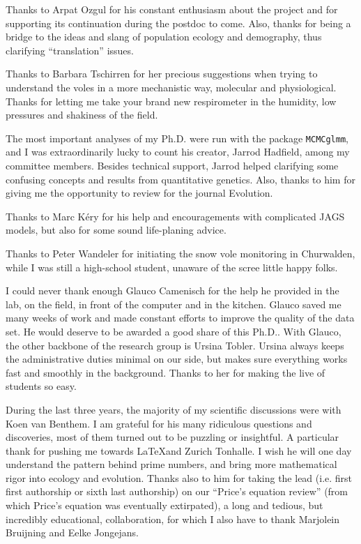 Thanks to Arpat Ozgul for his constant enthusiasm about the project and for supporting its continuation during the postdoc to come. Also, thanks for being a bridge to the ideas and slang of population ecology and demography, thus clarifying ``translation'' issues. 

Thanks to Barbara Tschirren for her precious suggestions when trying to understand the voles in a more mechanistic way, molecular and physiological. Thanks for letting me take your brand new respirometer in the humidity, low pressures and shakiness of the field. 

The most important analyses of my Ph.D. were run with the package \texttt{MCMCglmm}, and I was extraordinarily lucky to count his creator, Jarrod Hadfield, among my committee members. Besides technical support, Jarrod helped clarifying some confusing concepts and results from quantitative genetics. Also, thanks to him for giving me the opportunity to review for the journal Evolution. 

Thanks to Marc K\'{e}ry for his help and encouragements with complicated JAGS models, but also for some sound life-planing advice. 

Thanks to Peter Wandeler for initiating the snow vole monitoring in Churwalden, while I was still a high-school student, unaware of the scree little happy folks. 

I could never thank enough Glauco Camenisch for the help he provided in the lab, on the field, in front of the computer and in the kitchen. Glauco saved me many weeks of work and made constant efforts to improve the quality of the data set. He would deserve to be awarded a good share of this Ph.D..
With Glauco, the other backbone of the research group is Ursina Tobler. 
Ursina always keeps the administrative duties minimal on our side, but makes sure everything works fast and smoothly in the background. Thanks to her for making the live of students so easy. 

During the last three years, the majority of my scientific discussions were with Koen van Benthem. I am grateful for his many ridiculous questions and discoveries, most of them turned out to be puzzling or insightful. A particular thank for pushing me towards \LaTeX and Zurich Tonhalle. 
I wish he will one day understand the pattern behind prime numbers, and bring more mathematical rigor into ecology and evolution. 
Thanks also to him for taking the lead (i.e. first first authorship or sixth last authorship) on our ``Price's equation review'' (from which Price's equation was eventually extirpated), a long and tedious, but incredibly educational, collaboration, for which I also have to thank Marjolein Bruijning and Eelke Jongejans.

